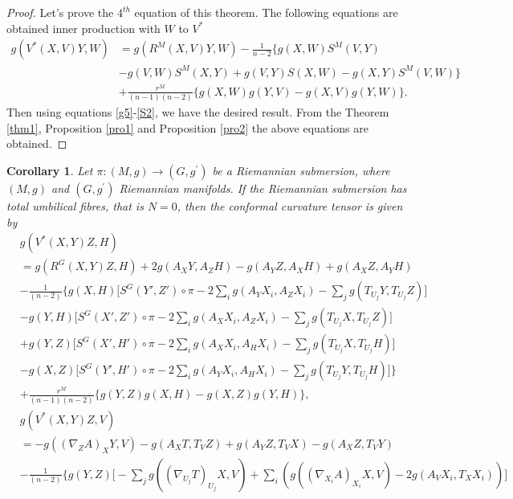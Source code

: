 \documentclass{birkjour}
\newtheorem{corollary}[theorem]{Corollary}
\theoremstyle{definition}
\theoremstyle{remark}
\numberwithin{equation}{section}
\begin{document}
\begin{proof}
	Let's prove the $4^{th}$ equation of this theorem. The following equations are obtained inner production with $W$ to $V^*$
	\begin{align*}
		g(V^*(X,V)Y,W)&=g(R^M(X,V)Y,W) -\frac{1}{n-2} \{g(X,W)S^M(V,Y) \\
		&-g(V,W)S^M(X,Y)+g(V,Y)S(X,W)-g(X,Y)S^M(V,W)\} \nonumber\\
		&+ \frac{r^M}{(n-1)(n-2)} \{g(X,W)g(Y,V)-g(X,V)g(Y,W)\}. \nonumber
	\end{align*}
	Then using equations \eqref{g5}-\eqref{S2}, we have the desired result.
	From the Theorem \ref{thm1}, Proposition \ref{pro1} and  Proposition \ref{pro2} the above equations are obtained.
\end{proof}

\begin{corollary}
Let $\pi: (M, g) \to(G, g^\prime)$ be a Riemannian submersion, where $(M, g)$ and $(G, g^\prime)$ Riemannian manifolds. If the Riemannian submersion has total umbilical fibres, that  is $N = 0$,  then the conformal curvature tensor is given by
	\begin{align*}
		&g(V^* (X,Y)Z, H) \\
		&=g(R^G (X,Y)Z, H) +2 g (A_X Y, A_Z H) - g(A_Y Z, A_X H) + g(A_X Z, A_Y H) \\
		&- \frac{1}{(n-2)} \Bigg\{g(X, H) \bigg[S^G (Y',Z') \circ \pi
		- 2 \sum_{i} g(A_Y X_i, A_Z X_i) - \sum_{j} g(T_{U_j}Y, T_{U_j}Z) \Bigg] \\
		&-g(Y,H) \bigg[S^G (X',Z') \circ \pi
		-2 \sum_{i} g(A_X X_i, A_Z X_i)- \sum_{j}g(T_{U_j}X, T_{U_j}Z)  \bigg] \\
		&+g(Y,Z) \bigg[S^G (X',H') \circ \pi
		-2 \sum_{i} g(A_X X_i, A_H X_i)- \sum_{j}g(T_{U_j}X, T_{U_j}H)  \bigg] \\
		&-g(X,Z) \bigg[S^G (Y',H') \circ \pi
		-2 \sum_{i} g(A_Y X_i, A_H X_i)- \sum_{j}g(T_{U_j}Y, T_{U_j}H)  \bigg]\Bigg\} \\
		&+ \frac{r^M}{(n-1)(n-2)} \{g(Y,Z) g(X,H)- g(X,Z)g(Y,H)\},
	\end{align*}
	\begin{align*}
		&g(V^* (X,Y)Z,V) \\
		&= -g((\nabla_Z A)_X Y,V) - g(A_X T, T_V Z) + g(A_Y Z, T_V X)- g(A_X Z, T_V Y) \\
		&- \frac{1}{(n-2)} \Bigg\{g(Y, Z) \bigg[-\sum_{j} g((\nabla_{U_j} T)_{U_j} X, V)
		+\sum_{i}\left(g((\nabla_{X_i}A)_{X_i} X,V )- 2 g (A_V X_i, T_X X_i) \right) \bigg] \\

\end{align*}
\end{corollary}
\end{document}
